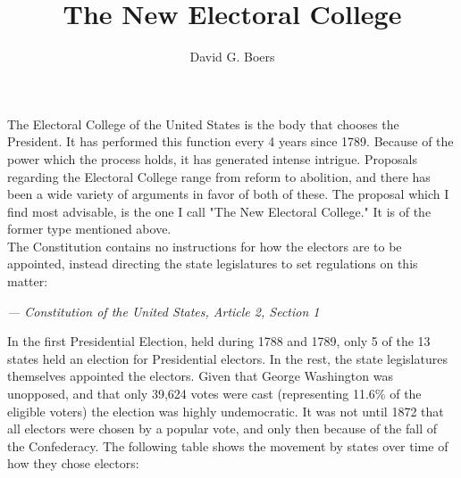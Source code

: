 \documentclass{article}
\title{The New Electoral College}
\author{David G. Boers}
\begin{document}
    \maketitle
    The Electoral College of the United States is the body that chooses the President. It has performed this function every 4 years since 1789. Because of the power which the process holds, it has generated intense intrigue. Proposals regarding the Electoral College range from reform to abolition, and there has been a wide variety of arguments in favor of both of these. The proposal which I find most advisable, is the one I call "The New Electoral College." It is of the former type mentioned above.\\
    
    The Constitution contains no instructions for how the electors are to be appointed, instead directing the state legislatures to set regulations on this matter:\\

    \begin{flushright}\textit{--- Constitution of the United States, Article 2, Section 1}\end{flushright}%

    In the first Presidential Election, held during 1788 and 1789, only 5 of the 13 states held an election for Presidential electors. In the rest, the state legislatures themselves appointed the electors. Given that George Washington was unopposed, and that only 39,624 votes were cast (representing 11.6\% of the eligible voters) the election was highly undemocratic. It was not until 1872 that all electors were chosen by a popular vote, and only then because of the fall of the Confederacy. The following table shows the movement by states over time of how they chose electors:\\
\end{document}
